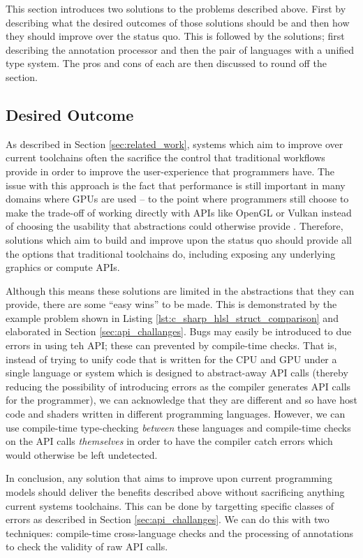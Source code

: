 \documentclass[a4paper,12pt,twoside,openright]{report}
\begin{document}
\label{sec:solutions_introduction}

This section introduces two solutions to the problems described above. First by
describing what the desired outcomes of those solutions should be and then how
they should improve over the status quo. This is followed by the solutions;
first describing the annotation processor and then the pair of languages with a
unified type system. The pros and cons of each are then discussed to round off
the section.

\subsection{Desired Outcome}

As described in Section \ref{sec:related_work}, systems which aim to improve
over current toolchains often the sacrifice the control that traditional
workflows provide in order to improve the user-experience that programmers
have. The issue with this approach is the fact that performance is still
important in many domains where GPUs are used -- to the point where programmers
still choose to make the trade-off of working directly with APIs like OpenGL or
Vulkan instead of choosing the usability that abstractions could otherwise
provide \cite{TODO}. Therefore, solutions which aim to build and improve upon
the status quo should provide all the options that traditional toolchains do,
including exposing any underlying graphics or compute APIs.

Although this means these solutions are limited in the abstractions that they
can provide, there are some ``easy wins'' to be made. This is demonstrated by
the example problem shown in Listing \ref{lst:c_sharp_hlsl_struct_comparison}
and elaborated in Section \ref{sec:api_challanges}. Bugs may easily be
introduced to due errors in using teh API; these can prevented by compile-time
checks. That is, instead of trying to unify code that is written for the CPU
and GPU under a single language or system which is designed to abstract-away
API calls (thereby reducing the possibility of introducing errors as the
compiler generates API calls for the programmer), we can acknowledge that they
are different and so have host code and shaders written in different
programming languages. However, we can use compile-time type-checking
\textit{between} these languages and compile-time checks on the API calls
\textit{themselves} in order to have the compiler catch errors which would
otherwise be left undetected.

In conclusion, any solution that aims to improve upon current programming
models should deliver the benefits described above without sacrificing anything
current systems toolchains. This can be done by targetting specific classes of
errors as described in Section \ref{sec:api_challanges}. We can do this with
two techniques: compile-time cross-language checks and the processing of
annotations to check the validity of raw API calls.
\end{document}

